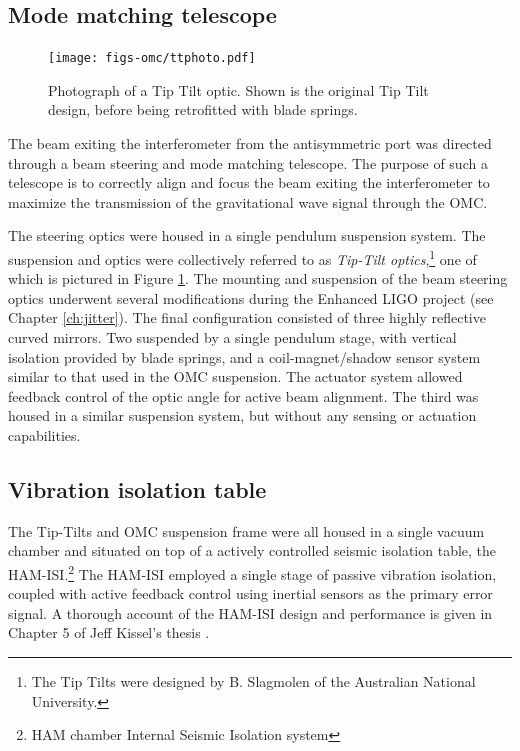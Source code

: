 \subsection{Mode matching telescope}
\begin{figure}
  \begin{center}
  \leavevmode
  \texttt{[image: figs-omc/ttphoto.pdf]}
  \end{center}
  \caption[Photograph of a Tip Tilt optic.]{Photograph of a Tip Tilt optic. Shown is the original Tip Tilt design, before being retrofitted with blade springs.}
  \label{fig:ttphoto}
\end{figure}
The beam exiting the interferometer from the antisymmetric port was directed through a beam steering and mode matching telescope. %
The purpose of such a telescope is to correctly align and focus the beam exiting the interferometer to maximize the transmission of the gravitational wave signal through the OMC.

The steering optics were housed in a single pendulum suspension system. %
The suspension and optics were collectively referred to as \emph{Tip-Tilt optics},\footnote{The Tip Tilts were designed by B. %
Slagmolen of the Australian National University\cite{T0900096}.} one of which is pictured in Figure \ref{fig:ttphoto}. %
The mounting and suspension of the beam steering optics underwent several modifications during the Enhanced LIGO project (see Chapter \ref{ch:jitter}). %
The final configuration consisted of three highly reflective curved mirrors. %
Two suspended by a single pendulum stage, with vertical isolation provided by blade springs, and a coil-magnet/shadow sensor system similar to that used in the OMC suspension. %
The actuator system allowed feedback control of the optic angle for active beam alignment. %
The third was housed in a similar suspension system, but without any sensing or actuation capabilities.

\subsection{Vibration isolation table}
The Tip-Tilts and OMC suspension frame were all housed in a single vacuum chamber and situated on top of a actively controlled seismic isolation table, the HAM-ISI.\footnote{HAM chamber Internal Seismic Isolation system} The HAM-ISI employed a single stage of passive vibration isolation, coupled with active feedback control using inertial sensors as the primary error signal. %
A thorough account of the HAM-ISI design and performance is given in Chapter 5 of Jeff Kissel's thesis \cite{kisselthesis}.

